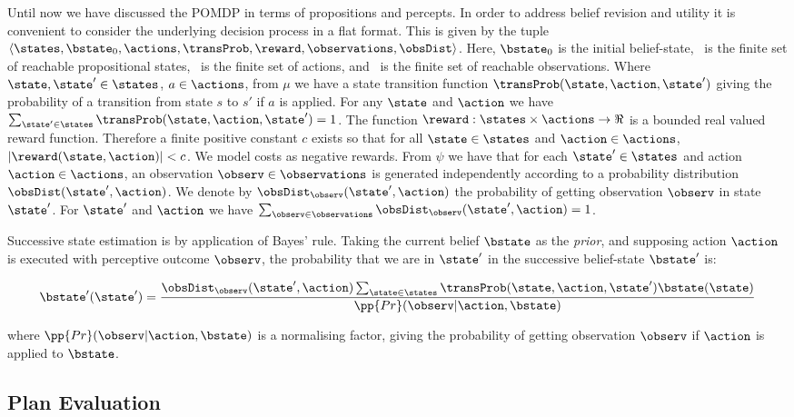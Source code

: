 Until now we have discussed the POMDP in terms of propositions and
percepts. In order to address belief revision and utility it is
convenient to consider the underlying decision process in a flat
format. This is given by the tuple
$\langle \states, \bstate_0, \actions, \transProb, \reward,
\observations, \obsDist \rangle$. Here, $\bstate_0$ is the initial
belief-state, \states\ is the finite set of reachable propositional
states, \actions\ is the finite set of actions, and \observations\ is
the finite set of reachable observations.  Where
$\state, \state' \in \states$, $a \in \actions$, from $\mu$ we have a
state transition function $\transProb(\state, \action,
\state')$ giving the probability of a transition from state $s$ to
$s'$ if $a$ is applied. For any $\state$ and $\action$ we have
$\sum_{\state' \in \states} \transProb(\state, \action, \state') = 1$.
The function $\reward:\states \times \actions \to \Re$ is a bounded real
valued reward function. Therefore a finite positive constant $c$
exists so that for all $\state \in \states$ and $\action \in
\actions$, $|\reward(\state, \action)| < c$. We model costs as
negative rewards.
From $\psi$ we have that for each $\state' \in \states$ and action
$\action \in \actions$, an observation $\observ \in \observations$ is
generated independently according to a probability distribution
$\obsDist(\state', \action)$. We denote by $\obsDist_\observ(\state',
\action)$ the probability of getting observation $\observ$ in state
$\state'$. For $\state'$ and $\action$ we have $\sum_{\observ \in
\observations} \obsDist_\observ(\state', \action) = 1$.

Successive state estimation is by application of Bayes'
rule.  Taking the current belief $\bstate$ as the {\em prior}, and
supposing action $\action$ is executed with perceptive outcome
$\observ$, the probability that we are in $\state'$ in the
successive belief-state $\bstate'$ is:

\begin{equation}\label{eq:revision}
\bstate'(\state') = \frac{\obsDist_\observ(\state', \action)
  \sum_{\state\in \states} \transProb(\state, \action, \state') \bstate(\state) }{\pp{Pr}(\observ | \action, \bstate)}
\end{equation}

\noindent where $\pp{Pr}(\observ | \action, \bstate)$ is a
normalising factor, giving the probability of getting observation
$\observ$ if $\action$ is applied to $\bstate$.

\subsection{Plan Evaluation}

